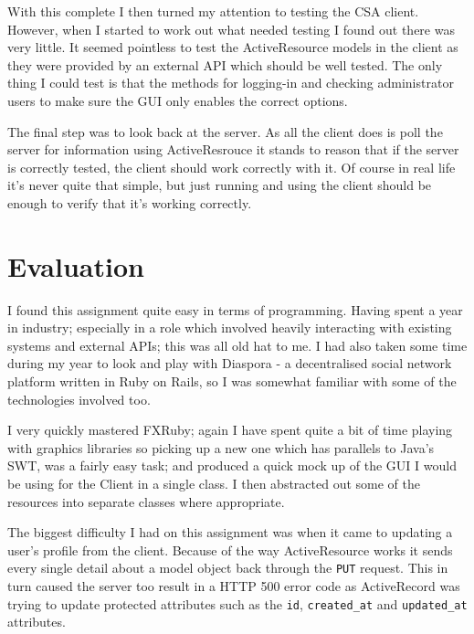 \documentclass{article}
\begin{document}
With this complete I then turned my attention to testing the CSA client. However, when
I started to work out what needed testing I found out there was very little. It seemed
pointless to test the ActiveResource models in the client as they were provided by an
external API which should be well tested. The only thing I could test is that the methods
for logging-in and checking administrator users to make sure the GUI only enables the
correct options.

The final step was to look back at the server. As all the client does is poll the server
for information using ActiveResrouce it stands to reason that if the server is correctly
tested, the client should work correctly with it. Of course in real life it's never quite
that simple, but just running and using the client should be enough to verify that it's
working correctly.

\clearpage
\section{Evaluation}
I found this assignment quite easy in terms of programming. Having spent a year in 
industry; especially in a role which involved heavily interacting with existing systems
and external APIs; this was all old hat to me. I had also taken some time during my year
to look and play with Diaspora - a decentralised social network platform written in Ruby
on Rails, so I was somewhat familiar with some of the technologies involved too.

I very quickly mastered FXRuby; again I have spent quite a bit of time playing with 
graphics libraries so picking up a new one which has parallels to Java's SWT, was a 
fairly easy task; and produced a quick mock up of the GUI I would be using for the Client
in a single class. I then abstracted out some of the resources into separate classes 
where appropriate.

The biggest difficulty I had on this assignment was when it came to updating a user's
profile from the client. Because of the way ActiveResource works it sends every single 
detail about a model object back through the \verb$PUT$ request. This in turn caused the
server too result in a HTTP 500 error code as ActiveRecord was trying to update protected
attributes such as the \verb$id$, \verb$created_at$ and \verb$updated_at$ attributes.
\end{document}
